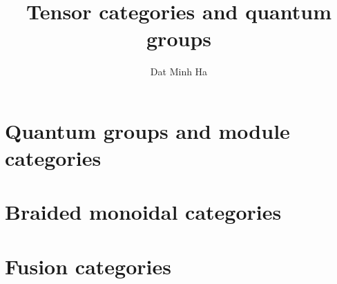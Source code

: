 

\setcounter{section}{-1}





	\title{Tensor categories and quantum groups}
	
	\author{Dat Minh Ha}
	\maketitle
	
	\begin{abstract}
	    
	\end{abstract}
	
	{
      \hypersetup{} 
      \tableofcontents %
    }
    
    \chapter{Quantum groups and module categories}
        \begin{abstract}
            
        \end{abstract}
        
        \minitoc
        
        
    
    \chapter{Braided monoidal categories}
        \begin{abstract}
            
        \end{abstract}
        
        \minitoc
    
    \chapter{Fusion categories}
        \begin{abstract}
            
        \end{abstract}
        
        \minitoc
        
        
        
